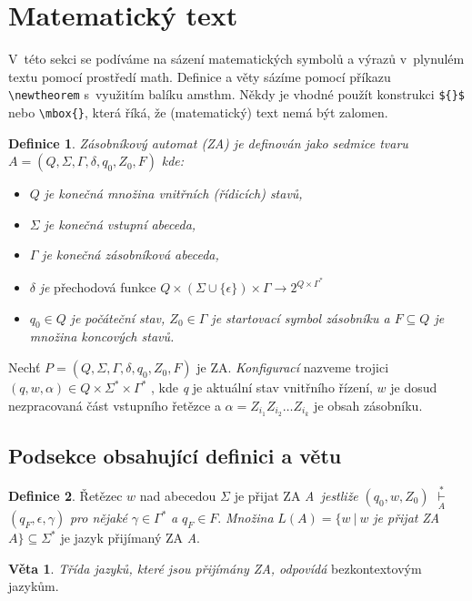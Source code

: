 \documentclass[11pt, twocolumn, a4paper]{article}
\theoremstyle{definition}
\newtheorem{definition}{Definice}
\newtheorem{sentence}{Věta}
\begin{document}
\section{Matematický text}
V~této sekci se podíváme na sázení matematických symbolů a výrazů v~plynulém textu pomocí
prostředí math. Definice a věty sázíme pomocí příkazu \verb|\newtheorem| s~využitím balíku
amsthm. Někdy je vhodné použít konstrukci \verb|${}$| nebo \verb|\mbox{}|, která říká, že
(matematický) text nemá být zalomen.
\begin{definition}
    \emph{Zásobníkový automat (ZA) je definován jako sedmice tvaru}
    ${A=(Q,\Sigma, \Gamma , \delta , q_0 , Z_0 , F)}$ \emph{kde:}
    \begin{itemize}
        \item ${Q}$ \emph{je konečná množina vnitřních (řídicích) stavů,}
        \item ${\Sigma}$ \emph{je konečná vstupní abeceda,}
        \item ${\Gamma}$ \emph{je konečná zásobníková abeceda,}
        \item ${\delta}$ \emph{je} přechodová funkce
        ${Q \times (\Sigma \cup \{\epsilon\})\times \Gamma \rightarrow 2^{Q \times \Gamma^\ast}}$
        \item ${q_0 \in Q}$ \emph{je počáteční stav, ${Z_0 \in \Gamma}$ je startovací symbol
        zásobníku a ${F \subseteq Q}$ je množina koncových stavů.}
    \end{itemize}
    \par Nechť ${P=(Q,\Sigma, \Gamma , \delta , q_0 , Z_0 , F)}$ je ZA. \emph{Konfigurací}
    nazveme trojici ${(q, w, \alpha) \in Q \times \Sigma^\ast \times \Gamma^\ast}$
    , kde \emph{q} je aktuální stav vnitřního řízení, $w$ je dosud nezpracovaná část vstupního řetězce a
    ${\alpha = Z_{i_{1}} Z_{i_{2}} \dots Z_{i_{k}}}$ je obsah zásobníku.
\end{definition}

\subsection{Podsekce obsahující definici a větu}
\begin{definition}
    Řetězec $w$ nad abecedou $\Sigma$ je přijat ZA \emph{A~jestliže} ${(q_0, w, Z_0)}$
    $\overset{\ast}{\underset{A}{\vdash}}$ ${(q_F, \epsilon, \gamma)}$ \emph{pro nějaké}
    ${\gamma \in \Gamma^\ast}$ \emph{a} ${q_F \in F}$. \emph{Množina}
    ${L(A) = \{w~|~w}$ \emph{je přijat} \emph{ZA}~${ A\} \subseteq \Sigma^\ast}$ je jazyk přijímaný ZA \emph{A}.
\end{definition}
\begin{sentence}
    \emph{Třída jazyků, které jsou přijímány ZA, odpovídá} bezkontextovým jazykům.
\end{sentence}
\end{document}
